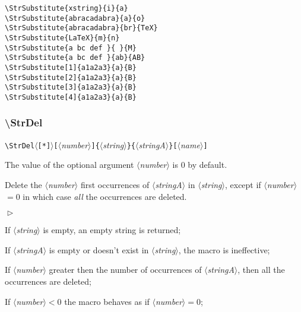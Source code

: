 \documentclass[a4paper,10pt]{article}
\newcommand\argu[1]{$\langle$\textit{#1}$\rangle$}
\newcommand\ARGU[1]{\texttt{\{}\argu{#1}\texttt{\}}}
\newcommand\arguC[1]{\texttt{[}\argu{#1}\texttt{]}}
\newcommand\etoile{$\langle$\texttt{[*]}$\rangle$}
\newenvironment{Conditions}[1][1cm]%
{\begin{list}%
	{$\vartriangleright$}%
	{\setlength{\leftmargin}{#1}
	 \setlength{\itemsep}{0pt}
	 \setlength{\parsep}{0pt}
	 \setlength{\topsep}{2ptplus3ptminus2pt}
	}}%
{\end{list}}
\newcommand\styleexemple{\small\vskip4pt}
\newcommand\verbinline{\lstinline[basicstyle=\normalsize\ttfamily]}
\begin{document}
\begin{minipage}[t]{0.65\linewidth}
\begin{lstlisting}
\StrSubstitute{xstring}{i}{a}
\StrSubstitute{abracadabra}{a}{o}
\StrSubstitute{abracadabra}{br}{TeX}
\StrSubstitute{LaTeX}{m}{n}
\StrSubstitute{a bc def }{ }{M}
\StrSubstitute{a bc def }{ab}{AB}
\StrSubstitute[1]{a1a2a3}{a}{B}
\StrSubstitute[2]{a1a2a3}{a}{B}
\StrSubstitute[3]{a1a2a3}{a}{B}
\StrSubstitute[4]{a1a2a3}{a}{B}
\end{lstlisting}%
\end{minipage}\hfill
\begin{minipage}[t]{0.35\linewidth}
	\styleexemple
	\par
	\par
	\par
	\par
	\par
	\par
	\par
	\par
	\par
\end{minipage}%

\subsubsection{\ttfamily\textbackslash StrDel}

\verbinline|\StrDel|\etoile\arguC{number}\ARGU{string}\ARGU{stringA}\arguC{name}
\smallskip

The value of the optional argument \argu{number} is 0 by default.\par\smallskip

Delete the \argu{number} first occurrences of \argu{stringA} in \argu{string}, except if \argu{number}${}=0$ in which case \emph{all} the occurrences are deleted.\medskip

\begin{Conditions}
\item If \argu{string} is empty, an empty string is returned;
\item If \argu{stringA} is empty or doesn't exist in \argu{string}, the macro is ineffective;
\item If \argu{number} greater then the number of occurrences of \argu{stringA}, then all the occurrences are deleted;
\item If \argu{number}${}<0$ the macro behaves as if \argu{number}${}=0$;
\end{Conditions}
\end{document}
